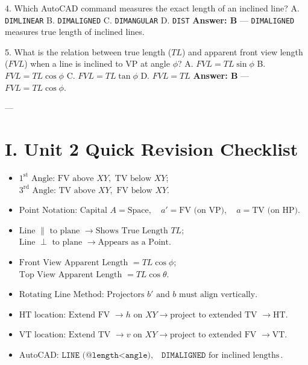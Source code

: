4. Which AutoCAD command measures the exact length of an inclined line?  
   A. \texttt{DIMLINEAR}  
   B. \texttt{DIMALIGNED}  
   C. \texttt{DIMANGULAR}  
   D. \texttt{DIST}  
   \textbf{Answer: B} — \texttt{DIMALIGNED} measures true length of inclined lines.

5. What is the relation between true length ($TL$) and apparent front view length ($FVL$) when a line is inclined to VP at angle $\phi$?  
   A. $FVL = TL \sin \phi$  
   B. $FVL = TL \cos \phi$  
   C. $FVL = TL \tan \phi$  
   D. $FVL = TL$  
   \textbf{Answer: B} — $FVL = TL \cos \phi$.

---

\section{I. Unit 2 Quick Revision Checklist}
\begin{revisionchecklist}
\begin{itemize}
    \item $1^{\text{st}}\text{ Angle: } \text{FV above } XY, \text{ TV below } XY$; $3^{\text{rd}}\text{ Angle: } \text{TV above } XY, \text{ FV below } XY$.
    \item $\text{Point Notation: } \text{Capital } A = \text{Space}, \quad a' = \text{FV (on VP)}, \quad a = \text{TV (on HP)}$.
    \item $\text{Line } \parallel \text{ to plane } \to \text{Shows True Length } TL$; $\text{Line } \perp \text{ to plane } \to \text{Appears as a Point}$.
    \item $\text{Front View Apparent Length } = TL \cos \phi$; $\text{Top View Apparent Length } = TL \cos \theta$.
    \item $\text{Rotating Line Method: } \text{Projectors } b' \text{ and } b \text{ must align vertically}$.
    \item $\text{HT location: } \text{Extend FV } \to h \text{ on } XY \to \text{project to extended TV } \to \text{HT}$.
    \item $\text{VT location: } \text{Extend TV } \to v \text{ on } XY \to \text{project to extended FV } \to \text{VT}$.
    \item $\text{AutoCAD: } \texttt{LINE (@length<angle)}, \quad \texttt{DIMALIGNED} \text{ for inclined lengths}$.
\end{itemize}
\end{revisionchecklist}
